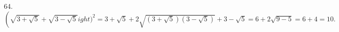 64. $\left(\sqrt{3+\sqrt{5}}+\sqrt{3-\sqrt{5}}
ight)^2=3+\sqrt{5}+2\sqrt{(3+\sqrt{5})(3-\sqrt{5})}+3-\sqrt{5}=
6+2\sqrt{9-5}=6+4=10.$\\
